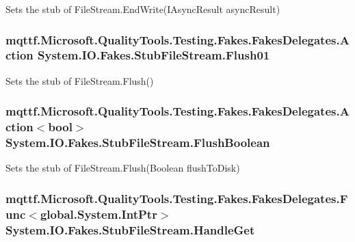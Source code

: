 Sets the stub of File\-Stream.\-End\-Write(\-I\-Async\-Result async\-Result)

\hypertarget{class_system_1_1_i_o_1_1_fakes_1_1_stub_file_stream_ac510c42dbc23f293b98edb214a6b0207}{
\subsubsection[{Flush01}]{\setlength{\rightskip}{0pt plus 5cm}mqttf.\-Microsoft.\-Quality\-Tools.\-Testing.\-Fakes.\-Fakes\-Delegates.\-Action System.\-I\-O.\-Fakes.\-Stub\-File\-Stream.\-Flush01}}\label{class_system_1_1_i_o_1_1_fakes_1_1_stub_file_stream_ac510c42dbc23f293b98edb214a6b0207}


Sets the stub of File\-Stream.\-Flush()

\hypertarget{class_system_1_1_i_o_1_1_fakes_1_1_stub_file_stream_aa2edbc013e71dbae8459efc0f7515be2}{
\subsubsection[{Flush\-Boolean}]{\setlength{\rightskip}{0pt plus 5cm}mqttf.\-Microsoft.\-Quality\-Tools.\-Testing.\-Fakes.\-Fakes\-Delegates.\-Action$<$bool$>$ System.\-I\-O.\-Fakes.\-Stub\-File\-Stream.\-Flush\-Boolean}}\label{class_system_1_1_i_o_1_1_fakes_1_1_stub_file_stream_aa2edbc013e71dbae8459efc0f7515be2}


Sets the stub of File\-Stream.\-Flush(\-Boolean flush\-To\-Disk)

\hypertarget{class_system_1_1_i_o_1_1_fakes_1_1_stub_file_stream_af097fdb5e36bd9bb20ac86b41f4453de}{
\subsubsection[{Handle\-Get}]{\setlength{\rightskip}{0pt plus 5cm}mqttf.\-Microsoft.\-Quality\-Tools.\-Testing.\-Fakes.\-Fakes\-Delegates.\-Func$<$global.\-System.\-Int\-Ptr$>$ System.\-I\-O.\-Fakes.\-Stub\-File\-Stream.\-Handle\-Get}}\label{class_system_1_1_i_o_1_1_fakes_1_1_stub_file_stream_af097fdb5e36bd9bb20ac86b41f4453de}


